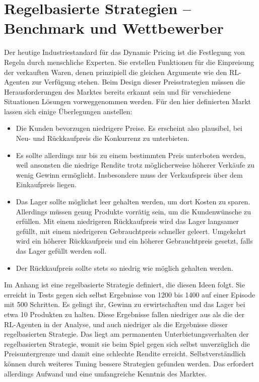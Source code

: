 \section{Regelbasierte Strategien -- Benchmark und Wettbewerber}
\label{section:rulebased}
Der heutige Industriestandard für das Dynamic Pricing ist die Festlegung von Regeln durch menschliche Experten.
Sie erstellen Funktionen für die Einpreisung der verkauften Waren, denen prinzipiell die gleichen Argumente wie den RL-Agenten zur Verfügung stehen.
Beim Design dieser Preisstrategien müssen die Herausforderungen des Marktes bereits erkannt sein und für verschiedene Situationen Lösungen vorweggenommen werden.
Für den hier definierten Markt lassen sich einige Überlegungen anstellen:
\begin{itemize}
	\item Die Kunden bevorzugen niedrigere Preise.
	Es erscheint also plausibel, bei Neu- und Rückkaufpreis die Konkurrenz zu unterbieten.
	\item Es sollte allerdings nur bis zu einem bestimmten Preis unterboten werden, weil ansonsten die niedrige Rendite trotz möglicherweise höherer Verkäufe zu wenig Gewinn ermöglicht.
	Insbesondere muss der Verkaufspreis über dem Einkaufpreis liegen.
	\item Das Lager sollte möglichst leer gehalten werden, um dort Kosten zu sparen.
	Allerdings müssen genug Produkte vorrätig sein, um die Kundenwünsche zu erfüllen.
	Mit einem niedrigeren Rückkaufpreis wird das Lager langsamer gefüllt, mit einem niedrigeren Gebrauchtpreis schneller geleert.
	Umgekehrt wird ein höherer Rückkaufpreis und ein höherer Gebrauchtpreis gesetzt, falls das Lager gefüllt werden soll.
	\item Der Rückkaufpreis sollte stets so niedrig wie möglich gehalten werden.
\end{itemize}
Im Anhang ist eine regelbasierte Strategie definiert, die diesen Ideen folgt.
Sie erreicht in Tests gegen sich selbst Ergebnisse von 1200 bis 1400 auf einer Episode mit 500 Schritten.
Es gelingt ihr, Gewinn zu erwirtschaften und das Lager bei etwa 10 Produkten zu halten.
Diese Ergebnisse fallen niedriger aus als die der RL-Agenten in der Analyse, und auch niedriger als die Ergebnisse dieser regelbasierten Strategie.
Das liegt am permanenten Unterbietungsverhalten der regelbasierten Strategie, womit sie beim Spiel gegen sich selbst unverzüglich die Preisuntergrenze und damit eine schlechte Rendite erreicht.
Selbstverständlich können durch weiteres Tuning bessere Strategien gefunden werden.
Das erfordert allerdings Aufwand und eine umfangreiche Kenntnis des Marktes.